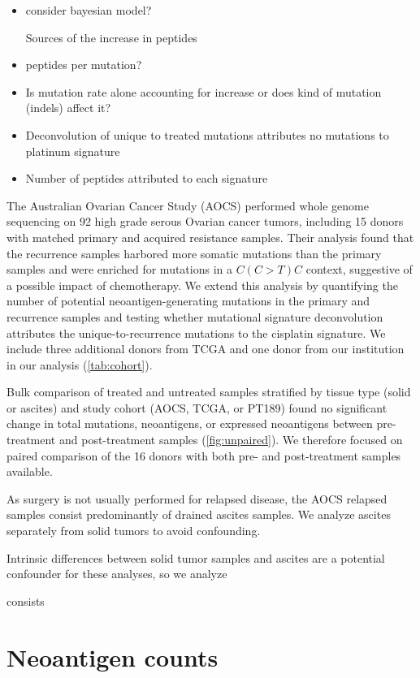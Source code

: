 \begin{itemize}
\item consider bayesian model?

Sources of the increase in peptides


\item peptides per mutation?
\item Is mutation rate alone accounting for increase or does kind of mutation (indels) affect it?

\item Deconvolution of unique to treated mutations attributes no mutations to platinum signature
\item Number of peptides attributed to each signature
\end{itemize}

The Australian Ovarian Cancer Study (AOCS)\cite{Patch_2015} performed whole genome sequencing on 92 high grade serous Ovarian cancer tumors, including 15 donors with matched primary and acquired resistance samples. Their analysis found that the recurrence samples harbored more somatic mutations than the primary samples and were enriched for mutations in a $C(C \gt T)C$ context, suggestive of a possible impact of chemotherapy. We extend this analysis by quantifying the number of potential neoantigen-generating mutations in the primary and recurrence samples and testing whether mutational signature deconvolution attributes the unique-to-recurrence mutations to the  cisplatin signature. We include three additional donors from TCGA and one donor from our institution in our analysis (\ref{tab:cohort}).

Bulk comparison of treated and untreated samples stratified by tissue type (solid or ascites) and study cohort (AOCS, TCGA, or PT189) found no significant change in total mutations, neoantigens, or expressed neoantigens between pre-treatment and post-treatment samples (\ref{fig:unpaired}). We therefore focused on paired comparison of the 16 donors with both pre- and post-treatment samples available. 

As surgery is not usually performed for relapsed disease, the AOCS relapsed samples consist predominantly of drained ascites samples. We analyze ascites separately from solid tumors to avoid confounding. 


Intrinsic differences between solid tumor samples and ascites are a potential confounder for these analyses, so we analyze 

consists 

\section*{Neoantigen counts}



